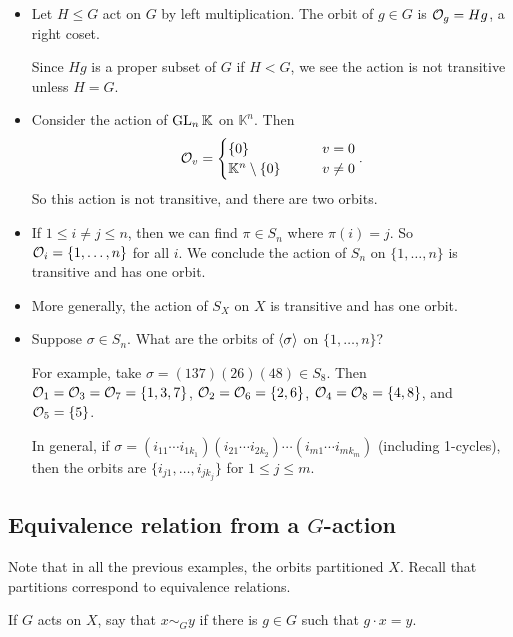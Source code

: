 \documentclass[12pt,letterpaper]{report}
\begin{document}
\begin{ex}
  \begin{itemize}
    \item Let $H \leq G$ act on $G$ by left multiplication.
    The orbit of $g \in G$ is $\mathcal{O}_g = Hg$, a right coset.

    Since $Hg$ is a proper subset of $G$ if $H < G$, we see the action is not transitive unless
    $H = G$.
    \item Consider the action of $\operatorname{GL}_n\mathbb{K}$ on $\mathbb{K}^n$.
    Then
    \[
      \mathcal{O}_v = \begin{cases}
        \{0\} & v = 0 \\
        \mathbb{K}^n \setminus \{0\} \qquad & v \neq 0
      \end{cases}.
    \]
    So this action is not transitive, and there are two orbits.
    \item If $1 \leq i \neq j \leq n$, then we can find $\pi \in S_n$ where $\pi(i) = j$.
    So $\mathcal{O}_i = \{1, \ldots, n\}$ for all $i$.
    We conclude the action of $S_n$ on $\{1, \ldots, n\}$ is transitive and has one orbit.
    \item More generally, the action of $S_X$ on $X$ is transitive and has one orbit.
    \item Suppose $\sigma \in S_n$.
    What are the orbits of $\langle\sigma\rangle$ on $\{1, \ldots, n\}$?

    For example, take $\sigma = (137)(26)(48) \in S_8$.
    Then $\mathcal{O}_1 = \mathcal{O}_3 = \mathcal{O}_7 = \{1, 3, 7\}$, $\mathcal{O}_2 = \mathcal{O}_6 = \{2, 6\}$,
    $\mathcal{O}_4 = \mathcal{O}_8 = \{4, 8\}$, and $\mathcal{O}_5 = \{5\}$.

    In general, if
    $\sigma = (i_{11} \cdots i_{1k_1})(i_{21} \cdots i_{2k_2}) \cdots (i_{m1} \cdots i_{mk_m})$
    (including 1-cycles), then the orbits are $\{i_{j1}, \ldots, i_{jk_j}\}$ for $1 \leq j \leq m$.
  \end{itemize}
\end{ex}

\pagebreak
\subsection[Equivalence relation from a G-action]{Equivalence relation from a $G$-action}

Note that in all the previous examples, the orbits partitioned $X$.
Recall that partitions correspond to equivalence relations.

\begin{defn}{}{}
  If $G$ acts on $X$, say that $x \sim_G y$ if there is $g \in G$ such that $g \cdot x = y$.
\end{defn}
\end{document}
